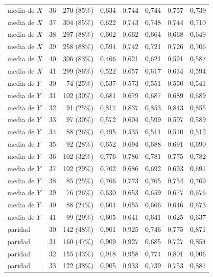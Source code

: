 \begin{table}[htbp]
{\begin{tabular}{@{}lrrrrrrr@{}}
        media de $X$ & 36 & 270 (85\%) & 0,634 & 0,744 & 0,744 & 0,757 & 0,739 \\
        media de $X$ & 37 & 304 (85\%) & 0,622 & 0,743 & 0,748 & 0,744 & 0,710 \\
        media de $X$ & 38 & 297 (88\%) & 0,602 & 0,662 & 0,664 & 0,668 & 0,649 \\
        media de $X$ & 39 & 258 (88\%) & 0,594 & 0,742 & 0,721 & 0,726 & 0,706 \\
        media de $X$ & 40 & 306 (83\%) & 0,466 & 0,621 & 0,621 & 0,591 & 0,587 \\
        media de $X$ & 41 & 299 (86\%) & 0,522 & 0,657 & 0,617 & 0,634 & 0,594 \\
        media de $Y$ & 30 & 74 (25\%) & 0,537 & 0,573 & 0,551 & 0,550 & 0,541 \\
        media de $Y$ & 31 & 102 (30\%) & 0,681 & 0,679 & 0,687 & 0,689 & 0,689 \\
        media de $Y$ & 32 & 91 (25\%) & 0,817 & 0,837 & 0,853 & 0,843 & 0,855 \\
        media de $Y$ & 33 & 97 (30\%) & 0,572 & 0,604 & 0,599 & 0,597 & 0,589 \\
        media de $Y$ & 34 & 88 (26\%) & 0,495 & 0,535 & 0,511 & 0,510 & 0,512 \\
        media de $Y$ & 35 & 92 (28\%) & 0,652 & 0,694 & 0,688 & 0,691 & 0,690 \\
        media de $Y$ & 36 & 102 (32\%) & 0,776 & 0,786 & 0,781 & 0,775 & 0,782 \\
        media de $Y$ & 37 & 102 (29\%) & 0,702 & 0,686 & 0,692 & 0,693 & 0,691 \\
        media de $Y$ & 38 & 85 (25\%) & 0,766 & 0,773 & 0,765 & 0,754 & 0,769 \\
        media de $Y$ & 39 & 76 (26\%) & 0,630 & 0,653 & 0,659 & 0,677 & 0,676 \\
        media de $Y$ & 40 & 88 (24\%) & 0,604 & 0,655 & 0,666 & 0,646 & 0,673 \\
        media de $Y$ & 41 & 99 (29\%) & 0,605 & 0,641 & 0,641 & 0,625 & 0,637 \\
        paridad & 30 & 142 (48\%) & 0,901 & 0,925 & 0,746 & 0,775 & 0,871 \\
        paridad & 31 & 160 (47\%) & 0,909 & 0,927 & 0,685 & 0,727 & 0,854 \\
        paridad & 32 & 155 (43\%) & 0,918 & 0,958 & 0,774 & 0,801 & 0,906 \\
        paridad & 33 & 122 (38\%) & 0,905 & 0,933 & 0,739 & 0,753 & 0,881 \\

\end{tabular}}
\end{table}
